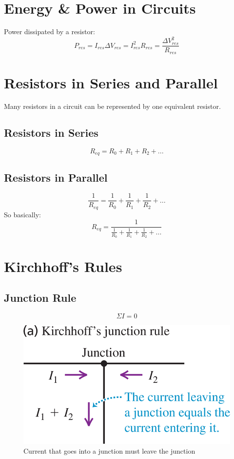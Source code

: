 \documentclass[10pt, a4paper, twocolumn]{article}
\begin{document}
    \section{Energy \& Power in Circuits}	
        Power dissipated by a resistor:\\
        $$P_{res} = I_{res} \Delta V_{res} = I^2_{res} R_{res} = \frac{\Delta V^2_{res}}{R_{res}}$$
    \section{Resistors in Series and Parallel}
        Many resistors in a circuit can be represented by one equivalent resistor.
        \subsection{Resistors in Series}
            $$R_{eq} = R_0 + R_1 + R_2 + ...$$
        \subsection{Resistors in Parallel}
        $$\frac{1}{R_{eq}} = \frac{1}{R_0} + \frac{1}{R_1} + \frac{1}{R_2} + ...$$ 
        So basically:\\
        $$R_{eq} = \frac{1}{\frac{1}{R_0} + \frac{1}{R_1} + \frac{1}{R_2} + ...}$$ 
    \section{Kirchhoff's Rules}
        \subsection{Junction Rule}
            $$\Sigma I = 0$$
            \begin{figure}[H]
                \includegraphics[width=0.5\linewidth]{junctionrule} %
                \caption{Current that goes into a junction must leave the junction}
            \end{figure}
\end{document}
